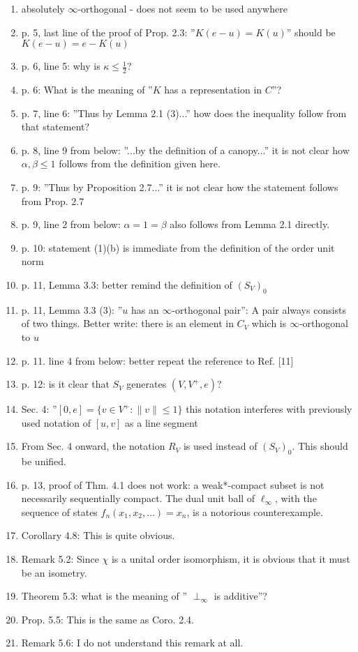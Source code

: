 \documentclass[12pt]{article}
\begin{document}
\begin{enumerate}

\item absolutely $\infty$-orthogonal - does not seem to be used anywhere 

\item p. 5, last line of the proof of Prop. 2.3: ''$K(e-u)=K(u)$'' should be
$K(e-u)=e-K(u)$ 

\item p. 6, line 5: why is $\kappa\le \frac12$? 

\item p. 6: What is the meaning of ''$K$ has a representation in $C$''?

\item p. 7, line 6: ''Thus by Lemma 2.1 (3)...'' how does the inequality follow from that
statement?

\item p. 8, line 9 from below: ''...by the definition of a canopy...''  
it is not clear how $\alpha,\beta\le 1$ follows from the definition given here.
\item p. 9: ''Thus by Proposition 2.7...'' it is not clear how the statement follows from
Prop. 2.7 
\item p. 9, line 2 from below: $\alpha=1=\beta$ also follows from Lemma 2.1 directly.
\item p. 10: statement (1)(b) is immediate from the definition of the order unit norm
\item p. 11, Lemma 3.3: better remind the definition of $(S_V)_0$
\item p. 11, Lemma 3.3 (3): ''$u$ has an $\infty$-orthogonal pair'': A pair always consists of two
things. Better write: there is an element in $C_V$ which is $\infty$-orthogonal to $u$
\item p. 11. line 4 from below: better repeat the reference to Ref. [11]
\item p. 12: is it clear that $S_V$ generates $(V,V^+,e)$?
\item Sec. 4: ''$[0,e]=\{v\in V^+: \|v\|\le 1\}$ this notation interferes with previously
used notation of $[u,v]$ as a line segment
\item From Sec. 4 onward, the notation $R_V$ is used instead of $(S_V)_0$. This should be
unified.
\item p. 13, proof of Thm. 4.1 does not work: a weak*-compact subset is not necessarily sequentially
compact. The dual unit ball of $\ell_\infty$, with the sequence of states
$f_n(x_1,x_2,\dots)=x_n$, is a notorious counterexample. 
\item Corollary 4.8: This is quite obvious.
\item Remark 5.2: Since $\chi$ is a unital order isomorphism, it is obvious that it must
be an isometry.
\item Theorem 5.3: what is the meaning of '' $\perp_\infty$ is additive''?
\item Prop. 5.5: This is the same as Coro. 2.4.
\item Remark 5.6: I do not understand this remark at all.
\end{enumerate}
\end{document}
